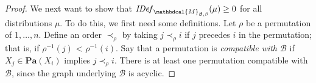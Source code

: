 \documentclass{article}
\theoremstyle{plain}
\theoremstyle{definition}
\theoremstyle{remark}
\newcommand{\dg}[1]{\mathbdcal{#1}}
\newcommand\Pa{\mathbf{Pa}}
\newcommand{\IDef}[1]{\mathit{IDef}_{#1}}
\newcommand{\PDGof}[1]{{\dg M}_{#1}}
\numberwithin{equation}{section}
\begin{document}
\begin{proof}
We next want to show  that $\IDef{\PDGof{\mathcal B,\beta}}(\mu) \ge 0$ for all
distributions $\mu$.  To do this, we first need some definitions.
Let $\rho$ be a permutation of $1, \ldots,  n$.  Define an order
$\prec_{\rho}$ by taking $j \prec_{\rho} i$ if $j$ precedes $i$ in the
permutation; that is, if 
$\rho^{-1}(j)$ < $\rho^{-1}(i)$. Say that a permutation is \emph{compatible with
  $\mathcal B$} if $X_j \in \Pa(X_i)$ implies $j \prec_{\rho} i$.   There
is at least one permutation compatible with $\mathcal B$, since 
the graph underlying $\mathcal B$ is acyclic.
  

\end{proof}
\end{document}

